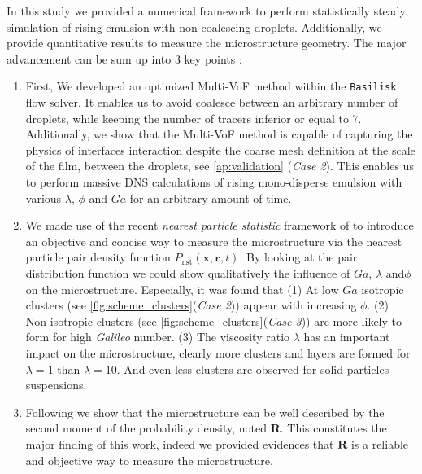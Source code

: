 


In this study we provided a numerical framework to perform statistically steady simulation of rising emulsion with non coalescing droplets. 
Additionally, we provide quantitative results to measure the microstructure geometry.
The major advancement can be sum up into 3 key points :
\begin{enumerate}
    \item First, We developed an optimized Multi-VoF method within the \texttt{Basilisk} flow solver. 
    It enables us to avoid coalesce between an arbitrary number of droplets, while keeping the number of tracers inferior or equal to $7$. 
    Additionally, we show that the Multi-VoF method is capable of capturing the physics of interfaces interaction despite the coarse mesh definition at the scale of the film, between the droplets, see \ref{ap:validation} (\textit{Case 2}). 
    This enables us to perform massive DNS calculations of rising mono-disperse emulsion with various $\lambda$, $\phi$ and $Ga$ for an arbitrary amount of time.
    \item We made use of the recent \textit{nearest particle statistic} framework of \citet{zhang2023evolution} to introduce an objective and concise way to measure the microstructure via the nearest particle pair density function $P_\text{nst}(\textbf{x},\textbf{r},t)$. 
    By looking at the pair distribution function we could show qualitatively the influence of $Ga$, $\lambda$ and$\phi$ on the microstructure.
    Especially, it was found that 
    (1) At low $Ga$ isotropic clusters (see \ref{fig:scheme_clusters}(\textit{Case 2})) appear with increasing $\phi$. 
    (2) Non-isotropic clusters (see \ref{fig:scheme_clusters}(\textit{Case 3})) are more likely to form for high \textit{Galileo} number.
    (3) The viscosity ratio $\lambda$ has an important impact on the microstructure, clearly more  clusters and layers are formed for $\lambda = 1$ than $\lambda = 10$. 
    And even less clusters are observed for solid particles suspensions. 
    \item Following \citet{zhang2023evolution} we show that the microstructure can be well described by the second moment of the probability density, noted $\textbf{R}$. 
    This constitutes the major finding of this work, indeed we provided evidences that $\textbf{R}$ is a reliable and objective way to measure the microstructure.

\end{enumerate}
